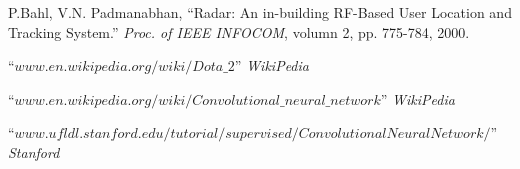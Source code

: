 \documentclass[a4paper, 11pt]{article} %
\begin{document}
\begin{thebibliography}{10}

P.Bahl, V.N. Padmanabhan,
``Radar: An in-building RF-Based User Location and Tracking System.''
\textit{Proc. of IEEE INFOCOM}, volumn 2, pp. 775-784, 2000.

``$www.en.wikipedia.org/wiki/Dota\_2$''
\textit{WikiPedia}

``$www.en.wikipedia.org/wiki/Convolutional\_neural\_network$''
\textit{WikiPedia}

``$www.ufldl.stanford.edu/tutorial/supervised/ConvolutionalNeuralNetwork/$''
\textit{Stanford}
\end{thebibliography}

\end{document}

